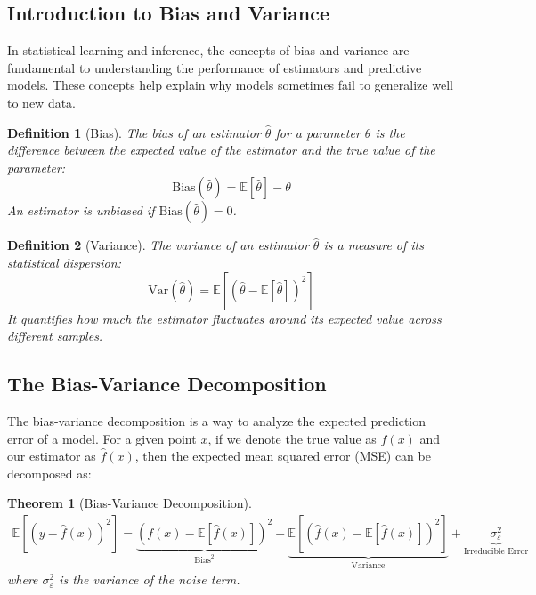 \documentclass{article}
\newtheorem{theorem}{Theorem}
\newtheorem{definition}{Definition}
\begin{document}
\subsection{Introduction to Bias and Variance}

In statistical learning and inference, the concepts of bias and variance are fundamental to understanding the performance of estimators and predictive models. These concepts help explain why models sometimes fail to generalize well to new data.

\begin{definition}[Bias]
The bias of an estimator $\hat{\theta}$ for a parameter $\theta$ is the difference between the expected value of the estimator and the true value of the parameter:
\[
\text{Bias}(\hat{\theta}) = \mathbb{E}[\hat{\theta}] - \theta
\]
An estimator is unbiased if $\text{Bias}(\hat{\theta}) = 0$.
\end{definition}

\begin{definition}[Variance]
The variance of an estimator $\hat{\theta}$ is a measure of its statistical dispersion:
\[
\text{Var}(\hat{\theta}) = \mathbb{E}[(\hat{\theta} - \mathbb{E}[\hat{\theta}])^2]
\]
It quantifies how much the estimator fluctuates around its expected value across different samples.
\end{definition}

\subsection{The Bias-Variance Decomposition}

The bias-variance decomposition is a way to analyze the expected prediction error of a model. For a given point $x$, if we denote the true value as $f(x)$ and our estimator as $\hat{f}(x)$, then the expected mean squared error (MSE) can be decomposed as:

\begin{theorem}[Bias-Variance Decomposition]
\begin{align*}
\mathbb{E}[(y - \hat{f}(x))^2] = \underbrace{(f(x) - \mathbb{E}[\hat{f}(x)])^2}_{\text{Bias}^2} + \underbrace{\mathbb{E}[(\hat{f}(x) - \mathbb{E}[\hat{f}(x)])^2]}_{\text{Variance}} + \underbrace{\sigma^2_\varepsilon}_{\text{Irreducible Error}}
\end{align*}
where $\sigma^2_\varepsilon$ is the variance of the noise term.
\end{theorem}
\end{document}
